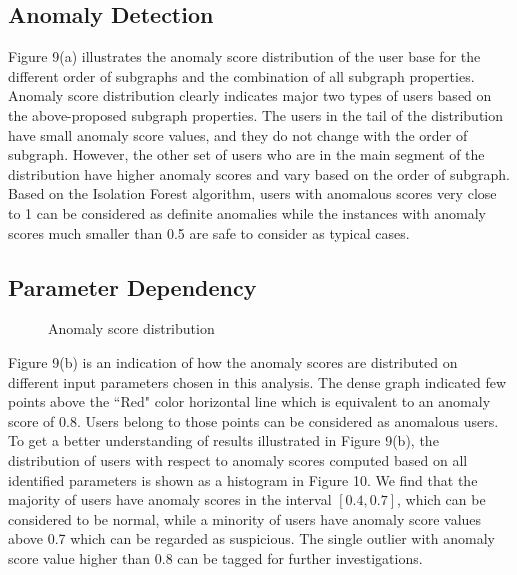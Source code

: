 \documentclass[conference,draftclsnofoot,onecolumn]{IEEEtran}%
\begin{document}
\subsection{Anomaly Detection}
Figure 9(a) illustrates the anomaly score distribution of the user base for the different order of subgraphs and the combination of all subgraph properties. Anomaly score distribution clearly indicates major two types of users based on the above-proposed subgraph properties. The users in the tail of the distribution have small anomaly score values, and they do not change with the order of subgraph. However, the other set of users who are in the main segment of the distribution have higher anomaly scores and vary based on the order of subgraph. Based on the Isolation Forest algorithm, users with anomalous scores very close to 1 can be considered as definite anomalies while the instances with anomaly scores much smaller than 0.5 are safe to consider as typical cases. 

\subsection{Parameter Dependency} 
\begin{figure}[h]
		\centering
		\hfil
		\caption{Anomaly score distribution}
		\label{figure 9}
		\vspace{-5pt}
\end{figure}

Figure 9(b) is an indication of how the anomaly scores are distributed on different input parameters chosen in this analysis. The dense graph indicated few points above the ``Red" color horizontal line which is equivalent to an anomaly score of 0.8. Users belong to those points can be considered as anomalous users. To get a better understanding of results illustrated in Figure 9(b), the distribution of users with respect to anomaly scores computed based on all identified parameters is shown as a histogram in Figure 10. We find that the majority of users have anomaly scores in the interval $[0.4,0.7]$, which can be considered to be normal, while a minority of users have anomaly score values above 0.7 which can be regarded as suspicious. The single outlier with anomaly score value higher than 0.8 can be tagged for further investigations. 
\end{document}
